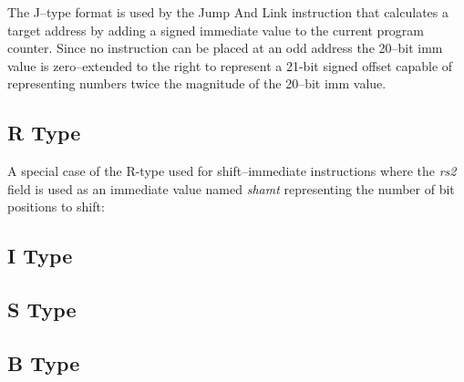 %

The J--type format is used by the Jump And Link instruction that calculates 
a target address by adding a signed immediate value to the current program 
counter.  Since no instruction can be placed at an odd address the 20--bit 
imm value is zero--extended to the right to represent a 21-bit signed offset 
capable of representing numbers twice the magnitude of the 20--bit imm value.


\subsection{R Type}
\label{insnformat:rtype}

A special case of the R-type used for shift--immediate instructions where 
the {\em rs2} field is used as an immediate value named {\em shamt} 
representing the number of bit positions to shift:


\subsection{I Type}
\label{insnformat:itype}

\subsection{S Type}
\label{insnformat:stype}

\subsection{B Type}
\label{insnformat:btype}





